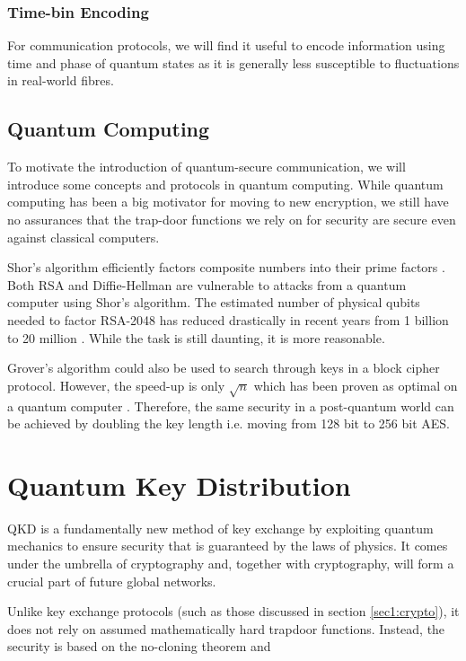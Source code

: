\subsubsection{Time-bin Encoding}

For communication protocols, we will find it useful to encode information using time and phase of quantum states as it is generally less susceptible to fluctuations in real-world fibres.

\subsection{Quantum Computing}

To motivate the introduction of quantum-secure communication, we will introduce some concepts and protocols in quantum computing. While quantum computing has been a big motivator for moving to new encryption, we still have no assurances that the trap-door functions we rely on for security are secure even against classical computers.

Shor's algorithm efficiently factors composite numbers into their prime factors \cite{shor1994}. Both RSA and Diffie-Hellman are vulnerable to attacks from a quantum computer using Shor's algorithm. The estimated number of physical qubits needed to factor RSA-2048 has reduced drastically in recent years from 1 billion \cite{mosca2018, fowler2012} to 20 million \cite{gidney2019}. While the task is still daunting, it is more reasonable.

Grover's algorithm could also be used to search through keys in a block cipher protocol. However, the speed-up is only $\sqrt{n}$ which has been proven as optimal on a quantum computer \cite{Bennent1997} . Therefore, the same security in a post-quantum world can be achieved by doubling the key length i.e. moving from 128 bit to 256 bit AES.

\section{Quantum Key Distribution}

\Acl{QKD} is a fundamentally new method of key exchange by exploiting quantum mechanics to ensure security that is guaranteed by the laws of physics. It comes under the umbrella of  cryptography and, together with  cryptography, will form a crucial part of future global networks.

Unlike key exchange protocols (such as those discussed in section \ref{sec1:crypto}), it does not rely on assumed mathematically hard trapdoor functions. Instead, the security is based on the no-cloning theorem and 


